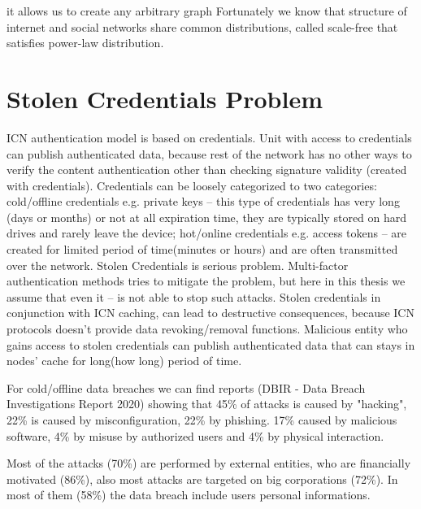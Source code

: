 \documentclass[nostrict]{szablonPG}
\begin{document}
it allows us to create any arbitrary graph  Fortunately we know that structure of internet and social networks share common distributions, called scale-free that satisfies power-law distribution. 



\section{Stolen Credentials Problem}
ICN authentication model is based on credentials.  Unit with access to credentials can publish authenticated data, because rest of the network has no other ways to verify the content authentication other than checking signature validity (created with credentials). Credentials can be loosely categorized to two categories: cold/offline credentials e.g. private keys -- this type of credentials has very long (days or months) or not at all expiration time, they are typically stored on hard drives and rarely leave the device; hot/online credentials e.g. access tokens -- are created for limited period of time(minutes or hours) and are often transmitted over the network. 
Stolen Credentials is serious problem. Multi-factor authentication methods tries to mitigate the problem, but here in this thesis we assume that even it -- is not able to stop such attacks.
Stolen credentials in conjunction with ICN caching, can lead to destructive consequences, because ICN protocols doesn't provide data revoking/removal functions. Malicious entity who gains access to stolen credentials can publish authenticated data that can stays in nodes' cache for long(how long) period of time. 

For cold/offline data breaches we can find reports (DBIR - Data Breach Investigations Report 2020) showing that 45\% of attacks is caused by "hacking", 22\% is caused by misconfiguration, 22\% by phishing.  17\% caused by malicious software, 4\% by misuse by authorized users and 4\% by physical interaction.

Most of the attacks (70\%) are performed by external entities, who are financially motivated (86\%), also most attacks are targeted on big corporations (72\%). In most of them (58\%) the data breach include users personal informations.  
\end{document}
